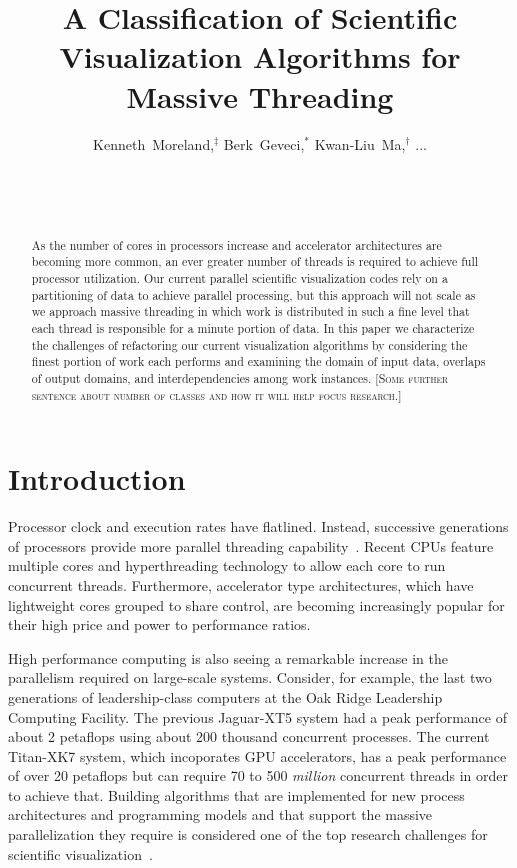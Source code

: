 \documentclass{sig-alternate}
\title{A Classification of Scientific Visualization Algorithms for Massive Threading}
\author{
  \alignauthor
  Kenneth~Moreland,$^{\ddagger}$ Berk~Geveci,$^*$ Kwan-Liu~Ma,$^{\dagger}$ ...\\
  \affaddr{$^{\ddagger}$Sandia National Laboratories}\\
  \affaddr{$^*$Kitware, Inc.}\\
  \affaddr{$^{\dagger}$University of California at Davis}\\
}
\newcommand*{\lcite}[1]{~\cite{#1}}
\newcommand{\fix}[1]{{\color{red}\textsc{[#1]}}}
\begin{document}
\sloppy

\maketitle

\begin{abstract}

As the number of cores in processors increase and accelerator architectures
are becoming more common, an ever greater number of threads is required to
achieve full processor utilization. Our current parallel scientific
visualization codes rely on a partitioning of data to achieve parallel
processing, but this approach will not scale as we approach massive
threading in which work is distributed in such a fine level that each
thread is responsible for a minute portion of data. In this paper we
characterize the challenges of refactoring our current visualization
algorithms by considering the finest portion of work each performs and
examining the domain of input data, overlaps of output domains, and
interdependencies among work instances. \fix{Some further sentence about
  number of classes and how it will help focus research.}

\end{abstract}

\section{Introduction}

\noindent
Processor clock and execution rates have flatlined. Instead, successive
generations of processors provide more parallel threading
capability\lcite{Sutter2005}. Recent CPUs feature multiple cores and
hyperthreading technology to allow each core to run concurrent
threads. Furthermore, accelerator type architectures, which have
lightweight cores grouped to share control, are becoming increasingly
popular for their high price and power to performance ratios.

High performance computing is also seeing a remarkable increase in the
parallelism required on large-scale systems. Consider, for example, the
last two generations of leadership-class computers at the Oak Ridge
Leadership Computing Facility. The previous Jaguar-XT5 system had a peak
performance of about 2 petaflops using about 200 thousand concurrent
processes. The current Titan-XK7 system, which incoporates GPU
accelerators, has a peak performance of over 20 petaflops but can require
70 to 500 \emph{million} concurrent threads in order to achieve
that. Building algorithms that are implemented for new process
architectures and programming models and that support the massive
parallelization they require is considered one of the top research
challenges for scientific visualization\lcite{Childs2013}.
\end{document}

